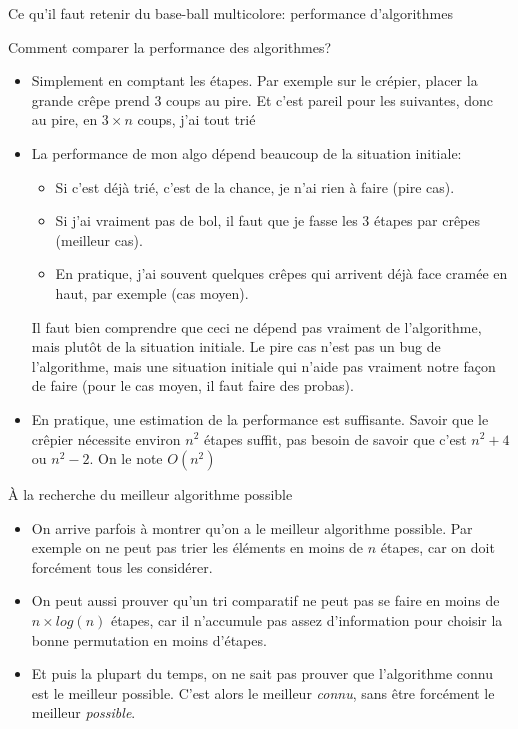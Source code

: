 \documentclass[final,hyperref={pdfpagelabels=false}]{beamer}
\begin{document}
\begin{frame}{Ce qu'il faut retenir du base-ball multicolore: performance d'algorithmes}
  \begin{block}{Comment comparer la performance des algorithmes?}
    \begin{itemize}
    \item Simplement en comptant les étapes. Par exemple sur le crépier, placer
      la grande crêpe prend 3 coups au pire. Et c'est pareil pour les
      suivantes, donc au pire, en $3\times n$ coups, j'ai tout trié
    \item La performance de mon algo dépend beaucoup de la situation initiale:
      \begin{itemize}
      \item Si c'est déjà trié, c'est de la chance, je n'ai rien à faire
        (\alert{pire cas}).
      \item Si j'ai vraiment pas de bol, il faut que je fasse les 3 étapes par
        crêpes (\alert{meilleur cas}).
      \item En pratique, j'ai souvent quelques crêpes qui arrivent déjà face
        cramée en haut, par exemple (\alert{cas moyen}).
      \end{itemize}
      Il faut bien comprendre que ceci ne dépend pas vraiment de l'algorithme,
      mais plutôt de la situation initiale. Le pire cas n'est pas un bug de
      l'algorithme, mais une situation initiale qui n'aide pas vraiment notre
      façon de faire (pour le cas moyen, il faut faire des probas).
    \item En pratique, une estimation de la performance est suffisante. Savoir
      que le crêpier nécessite environ $n^2$ étapes suffit, pas besoin de
      savoir que c'est $n^2+4$ ou $n^2-2$. On le note $O(n^2)$      
    \end{itemize}
  \end{block}

  \begin{block}{À la recherche du meilleur algorithme possible}
    \begin{itemize}
    \item On arrive parfois à montrer qu'on a le meilleur algorithme
      possible. Par exemple on ne peut pas trier les éléments en moins de $n$
      étapes, car on doit forcément tous les considérer.
    \item On peut aussi prouver qu'un tri comparatif ne peut pas se faire en
      moins de $n\times log(n)$ étapes, car il n'accumule pas assez
      d'information pour choisir la bonne permutation en moins d'étapes.
    \item Et puis la plupart du temps, on ne sait pas prouver que l'algorithme
      connu est le meilleur possible.  C'est alors le meilleur \textit{connu},
      sans être forcément le meilleur \textit{possible}.
    \end{itemize}
  \end{block}


\end{frame}
\end{document}
